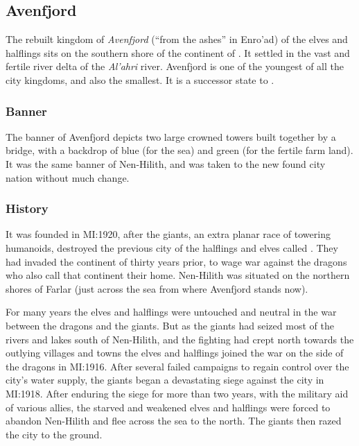 \subsection{Avenfjord}
\label{sec:Avenfjord}

The rebuilt kingdom of \emph{Avenfjord} (``from the ashes'' in Enro'ad) of the
elves and halflings sits on the southern shore of the continent of
. It settled in the vast and fertile river delta of the
\emph{Al'ahri} river. Avenfjord is one of the youngest of all the city
kingdoms, and also the smallest. It is a successor state to
.

\subsubsection{Banner}

The banner of Avenfjord depicts two large crowned towers built together by
a bridge, with a backdrop of blue (for the sea) and green (for the fertile
farm land). It was the same banner of Nen-Hilith, and was taken to the new
found city nation without much change.

\subsubsection{History}

It was founded in MI:1920, after the giants, an extra planar race of towering
humanoids, destroyed the previous city of the halflings and elves called
. They had invaded the continent of
 thirty years prior, to wage war against the dragons who
also call that continent their home. Nen-Hilith was situated on the northern
shores of Farlar (just across the sea from where Avenfjord stands now).

For many years the elves and halflings were untouched and neutral in the war
between the dragons and the giants. But as the giants had seized most of the
rivers and lakes south of Nen-Hilith, and the fighting had crept north towards
the outlying villages and towns the elves and halflings joined the war on the
side of the dragons in MI:1916. After several failed campaigns to regain
control over the city's water supply, the giants began a devastating siege
against the city in MI:1918. After enduring the siege for more than two years,
with the military aid of various allies, the starved and weakened elves and
halflings were forced to abandon Nen-Hilith and flee across the sea to the
north. The giants then razed the city to the ground.

